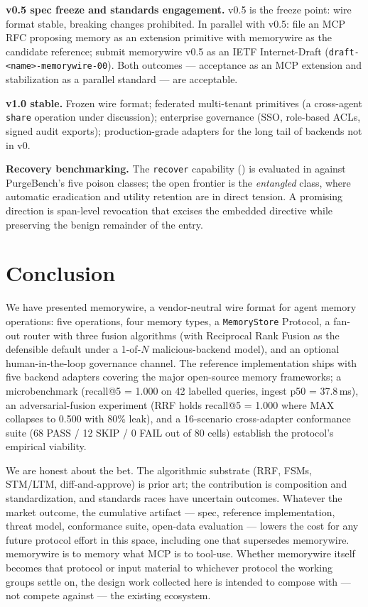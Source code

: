 \documentclass[11pt,letterpaper,twocolumn]{article}
\begin{document}
\textbf{v0.5 spec freeze and standards engagement.} v0.5 is the freeze point: wire format stable, breaking changes prohibited. In parallel with v0.5: file an MCP RFC proposing memory as an extension primitive with memorywire as the candidate reference; submit memorywire v0.5 as an IETF Internet-Draft (\texttt{draft-<name>-memorywire-00}). Both outcomes --- acceptance as an MCP extension and stabilization as a parallel standard --- are acceptable.

\textbf{v1.0 stable.} Frozen wire format; federated multi-tenant primitives (a cross-agent \texttt{share} operation under discussion); enterprise governance (SSO, role-based ACLs, signed audit exports); production-grade adapters for the long tail of backends not in v0.

\textbf{Recovery benchmarking.} The \texttt{recover} capability () is evaluated in  against PurgeBench's five poison classes; the open frontier is the \emph{entangled} class, where automatic eradication and utility retention are in direct tension. A promising direction is span-level revocation that excises the embedded directive while preserving the benign remainder of the entry.

\section{Conclusion}
\label{sec:conclusion}

We have presented memorywire, a vendor-neutral wire format for agent memory operations: five operations, four memory types, a \texttt{MemoryStore} Protocol, a fan-out router with three fusion algorithms (with Reciprocal Rank Fusion as the defensible default under a 1-of-$N$ malicious-backend model), and an optional human-in-the-loop governance channel. The reference implementation ships with five backend adapters covering the major open-source memory frameworks; a microbenchmark (recall@5 = 1.000 on 42 labelled queries, ingest p50 = 37.8\,ms), an adversarial-fusion experiment (RRF holds recall@5 = 1.000 where MAX collapses to 0.500 with 80\% leak), and a 16-scenario cross-adapter conformance suite (68 PASS / 12 SKIP / 0 FAIL out of 80 cells) establish the protocol's empirical viability.

We are honest about the bet. The algorithmic substrate (RRF, FSMs, STM/LTM, diff-and-approve) is prior art; the contribution is composition and standardization, and standards races have uncertain outcomes. Whatever the market outcome, the cumulative artifact --- spec, reference implementation, threat model, conformance suite, open-data evaluation --- lowers the cost for any future protocol effort in this space, including one that supersedes memorywire. memorywire is to memory what MCP is to tool-use. Whether memorywire itself becomes that protocol or input material to whichever protocol the working groups settle on, the design work collected here is intended to compose with --- not compete against --- the existing ecosystem.
\end{document}
